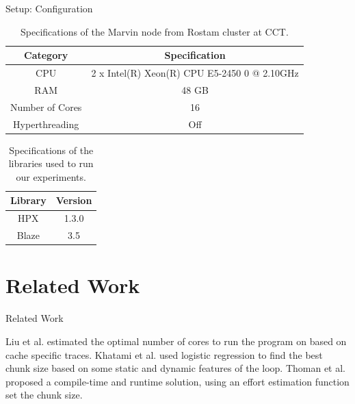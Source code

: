 \documentclass[10pt]{beamer}
\begin{document}
\begin{frame}{Setup: Configuration}
	\begin{outline}
	\vspace{\baselineskip}	
	\begin{table}[H]
		\centering
		\scalebox{0.75}
		{\begin{tabular}{|c | c |} 
				\hline
				
				Category & Specification\\
				\hline
				\hline
				CPU &  2 x Intel(R) Xeon(R) CPU E5-2450 0 @ 2.10GHz \\ [0.5ex] 
				\hline
				RAM & 48 GB\\ 	
				\hline
				Number of Cores & 16\\
				\hline	
				Hyperthreading & Off \\
				\hline			
		\end{tabular}}	
		\caption{Specifications of the Marvin node from Rostam cluster at CCT.}
		\label{table3}
	\end{table} 
\begin{table}[H]
	\centering
	\scalebox{0.75}
	{\begin{tabular}{|c | c |} 
			\hline
			Library & Version \\
			\hline
			\hline
			HPX & 1.3.0 \\ 
			\hline
			Blaze & 3.5\\ 	
			\hline
			
	\end{tabular}}	
	\caption{Specifications of the libraries used to run our experiments.}
	\label{table5}
\end{table}
	\end{outline}
\end{frame}

\section{Related Work}
	\begin{frame}{Related Work}
		\begin{outline}
			\1Liu et al. estimated the optimal number of cores to run the program on based on cache specific traces. 
			\1Khatami et al. used logistic regression to find the best chunk size based on some static and dynamic features of the loop.		
			\1Thoman et al. proposed a compile-time and runtime solution, using an effort estimation function set the chunk size. 
		\end{outline}
\end{frame}
\end{document}
